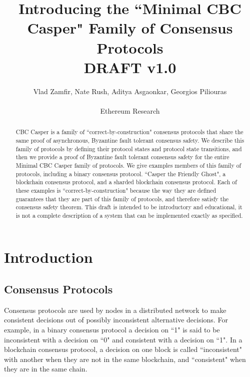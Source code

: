 \documentclass{article}
\theoremstyle{definition}
\begin{document}
\title{Introducing the ``Minimal CBC Casper" Family of Consensus Protocols  \\ \vspace{5mm} \small{DRAFT v1.0}}
\author{Vlad Zamfir, Nate Rush, Aditya Asgaonkar, Georgios Piliouras \\ \\ Ethereum Research}
\maketitle

\begin{abstract}
CBC Casper is a family of ``correct-by-construction" consensus protocols that share the same proof of asynchronous, Byzantine fault tolerant consensus safety. We describe this family of protocols by defining their protocol states and protocol state transitions, and then we provide a proof of Byzantine fault tolerant consensus safety for the entire Minimal CBC Casper family of protocols. We give examples members of this family of protocols, including a binary consensus protocol. ``Casper the Friendly Ghost", a blockchain consensus protocol, and a sharded blockchain consensus protocol. Each of these examples is ``correct-by-construction" because the way they are defined guarantees that they are part of this family of protocols, and therefore satisfy the consensus safety theorem. This draft is intended to be introductory and educational, it is not a complete description of a system that can be implemented exactly as specified.
\end{abstract}

\pagebreak
\tableofcontents

\pagebreak
\section{Introduction}

\subsection{Consensus Protocols}

Consensus protocols are used by nodes in a distributed network to make consistent decisions out of possibly inconsistent alternative decisions. For example, in a binary consensus protocol a decision on ``1" is said to be inconsistent with a decision on ``0" and consistent with a decision on ``1". In a blockchain consensus protocol, a decision on one block is called ``inconsistent" with another when they are not in the same blockchain, and ``consistent" when they are in the same chain.
\end{document}
